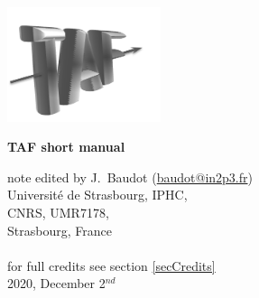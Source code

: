 \documentclass[a4paper, 12pt, twoside]{article}
\begin{document}
\sloppy


\begin{minipage}{.3\linewidth}
\begin{flushleft}
\includegraphics*[width=45mm]{logoTAF.png}\\
\end{flushleft}
\end{minipage}
\begin{minipage}{.65\linewidth}
\begin{flushleft}
\huge{\bf TAF short manual}
\end{flushleft}
\begin{flushright}
note edited by J.~Baudot (\href{mailto:baudot@in2p3.fr}{baudot@in2p3.fr})\\
Universit\'e de Strasbourg, IPHC, \\
CNRS, UMR7178,\\
Strasbourg, France\\
\hspace{1 cm} \\
for full credits see section \ref {secCredits}\\
\vspace*{.2cm}
2020, December 2$^{nd}$
\end{flushright}
\end{minipage}

\vspace{.5cm}
\end{document}
